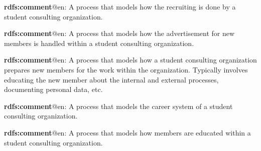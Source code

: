 \documentclass[a4paper, DIV=13, BCOR=0cm]{scrbook}
\begin{document}
\begin{mdframed}[style=onto-2, frametitle={Recruiting Process}]
	{%
		\begin{compactitem}
			\item \textbf{rdfs:comment}@en: A process that models how the recruiting is done by a student consulting organization.
		\end{compactitem}
	} %
\end{mdframed}

\begin{mdframed}[style=onto-3, frametitle={Advertising Process}]
	{%
		\begin{compactitem}
			\item \textbf{rdfs:comment}@en: A process that models how the advertisement for new members is handled within a student consulting organization.
		\end{compactitem}
	} %
\end{mdframed}

\begin{mdframed}[style=onto-2, frametitle={Onboarding Process}]
	{%
		\begin{compactitem}
			\item \textbf{rdfs:comment}@en: A process that models how a student consulting organization prepares new members for the work within the organization. Typically involves educating the new member about the internal and external processes, documenting personal data, etc.
		\end{compactitem}
	} %
\end{mdframed}

\begin{mdframed}[style=onto-2, frametitle={Career Process}]
	{%
		\begin{compactitem}
			\item \textbf{rdfs:comment}@en: A process that models the career system of a student consulting organization.
		\end{compactitem}
	} %
\end{mdframed}

\begin{mdframed}[style=onto-3, frametitle={Education Process}]
	{%
		\begin{compactitem}
			\item \textbf{rdfs:comment}@en: A process that models how members are educated within a student consulting organization.
		\end{compactitem}
	} %
\end{mdframed}
\end{document}
